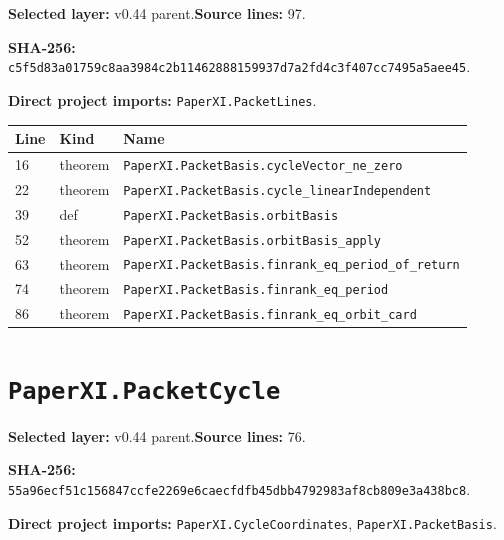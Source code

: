 \documentclass[10pt,oneside]{book}
\begin{document}
\textbf{Selected layer:} v0.44 parent.\quad\textbf{Source lines:} 97.\par\textbf{SHA-256:} {\scriptsize\nolinkurl{c5f5d83a01759c8aa3984c2b11462888159937d7a2fd4c3f407cc7495a5aee45}}.


\textbf{Direct project imports:} \nolinkurl{PaperXI.PacketLines}.

\begin{longtable}{@{}p{}p{}p{}@{}}\toprule Line&Kind&Name\\\midrule\endhead

16&theorem&\nolinkurl{PaperXI.PacketBasis.cycleVector_ne_zero}\\

22&theorem&\nolinkurl{PaperXI.PacketBasis.cycle_linearIndependent}\\

39&def&\nolinkurl{PaperXI.PacketBasis.orbitBasis}\\

52&theorem&\nolinkurl{PaperXI.PacketBasis.orbitBasis_apply}\\

63&theorem&\nolinkurl{PaperXI.PacketBasis.finrank_eq_period_of_return}\\

74&theorem&\nolinkurl{PaperXI.PacketBasis.finrank_eq_period}\\

86&theorem&\nolinkurl{PaperXI.PacketBasis.finrank_eq_orbit_card}\\

\bottomrule\end{longtable}

\section{\texorpdfstring{\nolinkurl{PaperXI.PacketCycle}}{PaperXI.PacketCycle}}\label{module:PaperXI.PacketCycle}

\textbf{Selected layer:} v0.44 parent.\quad\textbf{Source lines:} 76.\par\textbf{SHA-256:} {\scriptsize\nolinkurl{55a96ecf51c156847ccfe2269e6caecfdfb45dbb4792983af8cb809e3a438bc8}}.


\textbf{Direct project imports:} \nolinkurl{PaperXI.CycleCoordinates}, \nolinkurl{PaperXI.PacketBasis}.
\end{document}
